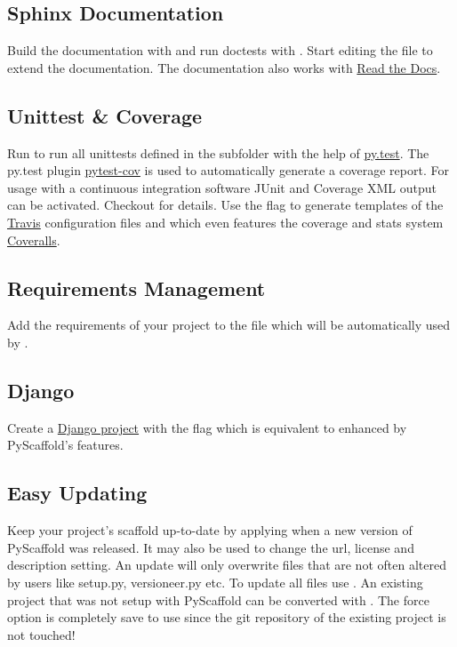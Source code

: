 \documentclass[letterpaper,10pt,english]{sphinxmanual}
\begin{document}
\subsection{Sphinx Documentation}
\label{features:sphinx-documentation}
Build the documentation with  and run doctests with
. Start editing the file  to
extend the documentation. The documentation also works with \href{https://readthedocs.org/}{Read the Docs}.


\subsection{Unittest \& Coverage}
\label{features:unittest-coverage}
Run  to run all unittests defined in the subfolder
 with the help of \href{http://pytest.org/}{py.test}. The py.test plugin
\href{https://github.com/schlamar/pytest-cov}{pytest-cov} is used to automatically
generate a coverage report. For usage with a continuous integration software
JUnit and Coverage XML output can be activated. Checkout  for
details. Use the flag  to generate templates of the
\href{https://travis-ci.org/}{Travis} configuration files  and
 which even features the coverage and stats system
\href{https://coveralls.io/}{Coveralls}.


\subsection{Requirements Management}
\label{features:requirements-management}
Add the requirements of your project to the  file which
will be automatically used by .


\subsection{Django}
\label{features:django}
Create a \href{https://www.djangoproject.com/}{Django project} with the flag
 which is equivalent to
 enhanced by PyScaffold's features.


\subsection{Easy Updating}
\label{features:easy-updating}
Keep your project's scaffold up-to-date by applying
 when a new version of PyScaffold was released.
It may also be used to change the url, license and description setting.
An update will only overwrite files that are not often altered by users like
setup.py, versioneer.py etc. To update all files use .
An existing project that was not setup with PyScaffold can be converted with
. The force option is completely save to use
since the git repository of the existing project is not touched!
\end{document}
